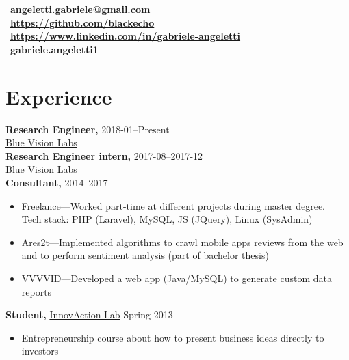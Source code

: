 \documentclass[margin]{res}
\begin{document}
    \address{Via A. Moro 9b \\ Rieti, RI, 02100  \\ (+39) 340 7082875}
    \begin{resume}
        \section{}
        \faEnvelope~\textbf{angeletti.gabriele@gmail.com} \\[5pt]
        \faGithub~\textbf{\url{https://github.com/blackecho}} \\[5pt]
        \faLinkedin~\textbf{\url{https://www.linkedin.com/in/gabriele-angeletti}} \\[5pt]
        \faSkype~\textbf{gabriele.angeletti1}

        \section{Experience}
            {\bf Research Engineer,} \hfill 2018-01--Present\\
            \href{http://www.bluevisionlabs.com}{Blue Vision Labs}\\
            {\bf Research Engineer intern,} \hfill 2017-08--2017-12\\
            \href{http://www.bluevisionlabs.com}{Blue Vision Labs}\\
            {\bf Consultant,} \hfill 2014--2017
            \begin{itemize} \itemsep-2pt    	
                \item Freelance---Worked part-time at different projects during master degree.\\
                    Tech stack: PHP (Laravel), MySQL, JS (JQuery), Linux (SysAdmin)
                \item \href{http://www.ares2t.com/en/web/home.php}{Ares2t}---Implemented algorithms to crawl
                    mobile apps reviews from the web and to perform sentiment analysis (part of bachelor thesis) 
                \item \href{https://www.vvvvid.it}{VVVVID}---Developed a web app (Java/MySQL) to generate custom
                    data reports
            \end{itemize}

            {\bf Student,} \href{http://www.innovactionlab.org/?lang=en}{InnovAction Lab} \hfill Spring 2013
            \begin{itemize} \itemsep-2pt
                \item Entrepreneurship course about how to present business ideas directly to investors
            \end{itemize}


\end{resume}
\end{document}

